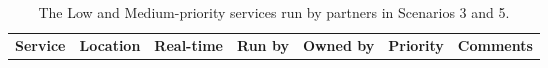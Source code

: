 \begin{center}
\begin{table}
\begin{tabular}{p{\mycolwidth} p{\mycolwidth} l l l l p{\mycolwidth}}
{\bf \tiny Service}  & {\bf \tiny Location} & \bf {\tiny Real-time} & {\bf \tiny Run by} & \bf {\tiny Owned by} & {\bf \tiny Priority} & {\bf \tiny Comments} \\

\end{tabular}
\caption{The Low and Medium-priority \einfra services run by partners in Scenarios 3 and 5. \label{tab:services:s3a}}
\end{table}
\end{center}
